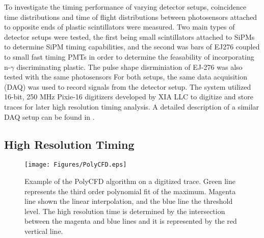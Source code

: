 To investigate the timing performance of varying detector setups, coincidence time distributions and time of flight distributions between photosensors attached to opposite ends of plastic scintillators were measured. Two main types of detector setups were tested, the first being small scintillators attached to SiPMs to determine SiPM timing capabilities, and the second was bars of EJ276 coupled to small fast timing PMTs in order to determine the feasability of incorporating n-$\gamma$  discriminating plastic. The pulse shape disrminiation of EJ-276 was also tested with the same photosensors For both setups, the same data acquisition (DAQ) was used to record signals from the detector setup. The system utilized 16-bit, 250 MHz Pixie-16 digitizers developed by XIA LLC \cite{XIA} to digitize and store traces for later high resolution timing analysis. A detailed description of a similar DAQ setup can be found in \cite{PAULAUSKAS201422}.

\subsection{High Resolution Timing}
\begin{figure}[bt]
\centering
\texttt{[image: Figures/PolyCFD.eps]}
\caption{Example of the PolyCFD algorithm on a digitized trace. Green line represents the third order polynomial fit of the maximum. Magenta line shown the linear interpolation, and the blue line the threshold level. The high resolution time is determined by the intersection between the magenta and blue lines and it is represented by the red vertical line.}
\label{fig:PolyCFD}
\end{figure}

